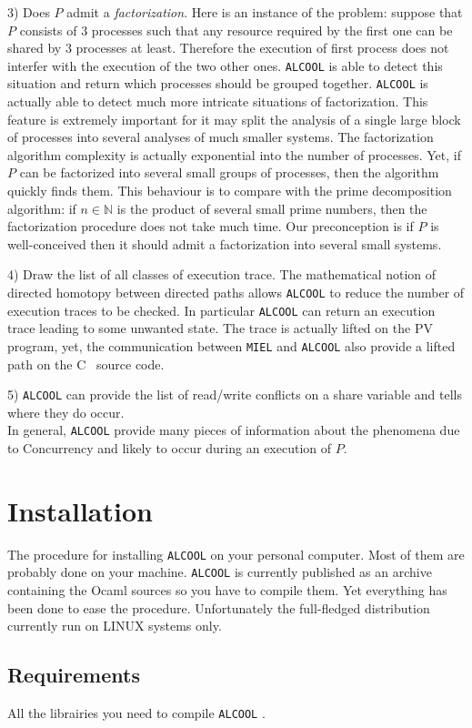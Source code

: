 \documentclass[article,11pt]{amsbook}
\def\alcool{\texttt{ALCOOL} }
\def\miel{\texttt{MIEL} }
\def\linux{{\sf LINUX} }
\def\c{{\sf C} }
\def\ocaml{{\sf Ocaml} }
\def\pv{{\sf PV} }
\def\N{{\mathbb{N}}}
\begin{document}
3) Does $P$ admit a {\em factorization}. Here is an instance of the
problem: suppose that $P$ consists of $3$ processes such that any
resource required by the first one can be shared by $3$ processes at
least. Therefore the execution of first process does not interfer with
the execution of the two other ones. \alcool is able to detect this
situation and return which processes should be grouped together. \alcool
is actually able to detect much more intricate situations of
factorization. This feature is extremely important for it may split the
analysis of a single large block of processes into several analyses of
much smaller systems. The factorization algorithm complexity is actually
exponential into the number of processes. Yet, if $P$ can be factorized
into several small groups of processes, then the algorithm quickly finds
them. This behaviour is to compare with the prime decomposition
algorithm: if $n\in\N$ is the product of several small prime numbers,
then the factorization procedure does not take much time. Our
preconception is if $P$ is well-conceived then it should admit a
factorization into several small systems.

4) Draw the list of all classes of execution trace. The mathematical
notion of directed homotopy between directed paths allows \alcool to
reduce the number of execution traces to be checked. In particular
\alcool can return an execution trace leading to some unwanted state.
The trace is actually lifted on the \pv program, yet, the communication
between \miel and \alcool also provide a lifted path on the \c\
source code.

5) \alcool can provide the list of read/write conflicts on a share
variable and tells where they do occur.\\

\noindent In general, \alcool provide many pieces of information about
the phenomena due to Concurrency and likely to occur during an execution
of $P$.
\section{Installation}
The procedure for installing \alcool on your personal computer. Most of
them are probably done on your machine. \alcool is currently published
as an archive containing the \ocaml sources so you have to compile
them. Yet everything has been done to ease the procedure. Unfortunately
the full-fledged distribution currently run on \linux systems only.
\subsection{Requirements} All the librairies you need to compile \alcool\!.
\end{document}
